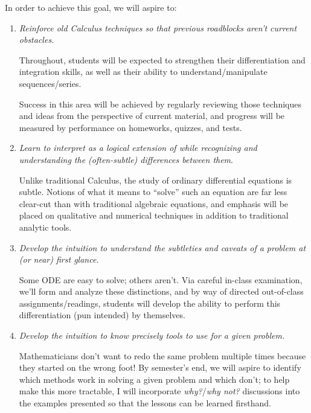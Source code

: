 \documentclass[12pt,oneside]{amsart}
\begin{document}
\noindent In order to achieve this goal, we will aspire to:\vspace{-3mm}
\begin{enumerate}[label=(Obj \arabic*),leftmargin=0.75in,rightmargin=0.25in,itemsep=1.5mm]
	\item \textit{Reinforce old Calculus techniques so that previous roadblocks aren't current obstacles.}
	
	Throughout, students will be expected to strengthen their differentiation and integration skills, as well as their ability to understand/manipulate sequences/series. 
	
	Success in this area will be achieved by regularly reviewing those techniques and ideas from the perspective of current material, and progress will be measured by performance on homeworks, quizzes, and tests. 
%	
	\item \textit{Learn to interpret {} as a logical extension of {} while recognizing and understanding the (often-subtle) differences between them}. 
	
	Unlike traditional Calculus, the study of ordinary differential equations is subtle. Notions of what it means to ``solve'' such an equation are far less clear-cut than with traditional algebraic equations, and emphasis will be placed on qualitative and numerical techniques in addition to traditional analytic tools.
	\item \textit{Develop the intuition to understand the subtleties and caveats of a problem at (or near) first glance.} 
	
	Some ODE are easy to solve; others aren't. Via careful in-class examination, we'll form and analyze these distinctions, and by way of directed out-of-class assignments/readings, students will develop the ability to perform this differentiation (pun intended) by themselves.
	\item \textit{Develop the intuition to know precisely {} tools to use for a given problem.}
	
	Mathematicians don't want to redo the same problem multiple times because they started on the wrong foot! By semester's end, we will aspire to identify which methods work in solving a given problem and which don't; to help make this more tractable, I will incorporate \textit{why?}/\textit{why not?} discussions into the examples presented so that the lessons can be learned firsthand.
\end{enumerate}
\end{document}
